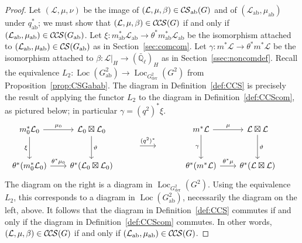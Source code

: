 \documentclass[10pt]{amsart}
\theoremstyle{plain}
\theoremstyle{definition}
\newcommand{\EE}{\mathbb{\bar Q}_\ell}
\DeclareMathOperator{\Loc}{Loc}
\newcommand{\der}{_{\operatorname{der}}}
\newcommand{\ab}{_{\operatorname{ab}}}
\newcommand{\cs}[1]{{\mathcal{#1}}}
\newcommand{\CS}{{\mathcal{C\hskip-0.8pt S}}}
\newcommand{\CCS}{{\mathcal{C\hskip-.8pt C\hskip-0.8pt S}}}
\newcommand{\CSab}{\CS_{\operatorname{ab}}}
\begin{document}
\begin{proof}
Let $(\cs{L},\mu,\nu)$ be the image of $(\cs{L},\mu,\beta)\in \CSab(G)$ and of $(\cs{L}\ab,\mu\ab)$ under $q\ab^*$;
we must show that $(\cs{L},\mu,\beta)\in \CCS(G)$ if and only if $(\cs{L}\ab,\mu\ab)\in \CCS(G\ab)$.
Let $\xi : m\ab^*\cs{L}\ab \to \theta^* m\ab^*\cs{L}\ab$ be the isomorphism attached to $(\cs{L}\ab,\mu\ab)\in \CS(G\ab)$ as in Section~\ref{sec:comcom}.
Let $\gamma : m^*\cs{L} \to \theta^* m^*\cs{L}$ be the isomorphism attached to $\beta : \cs{L}\vert_{H} \to (\EE)_{H}$ as in Section~\ref{ssec:noncomdef}.
Recall the equivalence $L_2 : \Loc(G^2\ab) \to  \Loc_{G^2\der}(G^2)$ from Proposition~\ref{prop:CSGabab}.
The diagram in Definition~\ref{def:CCS} is precisely the result of applying the functor $L_2$ to the diagram in Definition~\ref{def:CCScom}, as pictured below; 
in particular $\gamma = (q^2)^* \xi$.
  \[
  \begin{tikzcd}[row sep=10, column sep = 20]
   m_0^*\cs{L}_0 \arrow{dd}[swap]{\xi} \arrow{r}{\mu_0} 
   & \cs{L}_0\boxtimes\cs{L}_0 \arrow{dd}{\vartheta}
&&&   m^*\cs{L} \arrow{dd}[swap]{\gamma} \arrow{r}{\mu} 
 & \cs{L}\boxtimes\cs{L} \arrow{dd}{\vartheta}\\
 && \arrow{r}{(q^2)^*}  &\ & & &\\ 
   \theta^*(m_0^*\cs{L}_0) \arrow{r}{{\theta}^*\mu_0} 
 &  \theta^*(\cs{L}_0\boxtimes\cs{L}_0)
&&&   \theta^*(m^*\cs{L}) \arrow{r}{{\theta}^*\mu} 
&  \theta^*(\cs{L}\boxtimes\cs{L})
  \end{tikzcd}
\]
The diagram on the right is a diagram in $\Loc_{G^2\der}(G^2)$.
Using the equivalence $L_2$, this corresponds to a diagram in $\Loc(G^2\ab)$, necessarily the diagram on the left, above.
It follows that the diagram in Definition~\ref{def:CCS} commutes if and only if the diagram in Definition~\ref{def:CCScom} commutes. 
In other words, $(\cs{L},\mu,\beta)\in \CCS(G)$
if and only if $(\cs{L}\ab,\mu\ab)\in \CCS(G)$.
\end{proof}

%
\end{document}
